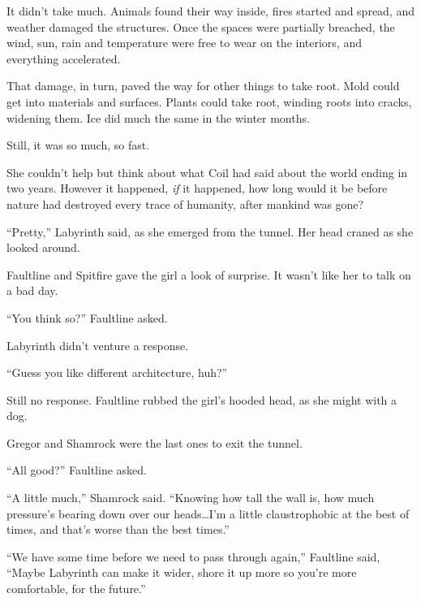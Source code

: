 It didn't take much.  Animals found their way inside, fires started and spread, and weather damaged the structures.  Once the spaces were partially breached, the wind, sun, rain and temperature were free to wear on the interiors, and everything accelerated.



That damage, in turn, paved the way for other things to take root.  Mold could get into materials and surfaces.  Plants could take root, winding roots into cracks, widening them.  Ice did much the same in the winter months.



Still, it was so much, so fast.



She couldn't help but think about what Coil had said about the world ending in two years.  However it happened, \emph{if} it happened, how long would it be before nature had destroyed every trace of humanity, after mankind was gone?



``Pretty,'' Labyrinth said, as she emerged from the tunnel.  Her head craned as she looked around.



Faultline and Spitfire gave the girl a look of surprise.  It wasn't like her to talk on a bad day.



``You think so?'' Faultline asked.



Labyrinth didn't venture a response.



``Guess you like different architecture, huh?''



Still no response.  Faultline rubbed the girl's hooded head, as she might with a dog.



Gregor and Shamrock were the last ones to exit the tunnel.



``All good?'' Faultline asked.



``A little much,'' Shamrock said.  ``Knowing how tall the wall is, how much pressure's bearing down over our heads\ldots I'm a little claustrophobic at the best of times, and that's worse than the best times.''



``We have some time before we need to pass through again,'' Faultline said, ``Maybe Labyrinth can make it wider, shore it up more so you're more comfortable, for the future.''



